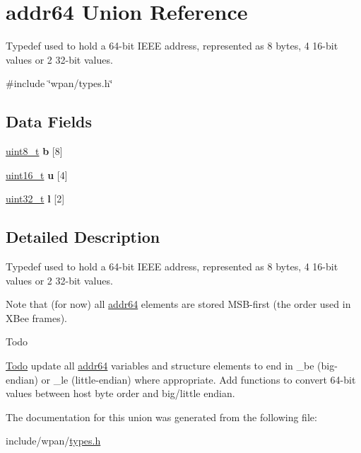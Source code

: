 \hypertarget{unionaddr64}{}\section{addr64 Union Reference}
\label{unionaddr64}


Typedef used to hold a 64-\/bit I\+E\+EE address, represented as 8 bytes, 4 16-\/bit values or 2 32-\/bit values.  




{\ttfamily \#include \char`\"{}wpan/types.\+h\char`\"{}}

\subsection*{Data Fields}
\begin{DoxyCompactItemize}
\item 
\hyperlink{group__hal__dos_gae1affc9ca37cfb624959c866a73f83c2}{uint8\+\_\+t} {\bfseries b} \mbox{[}8\mbox{]}
\item 
\hyperlink{group__hal__dos_ga5a8b2dc9e45a9ee81a94ef304fb62505}{uint16\+\_\+t} {\bfseries u} \mbox{[}4\mbox{]}
\item 
\hyperlink{group__hal__dos_ga09a1e304d66d35dd47daffee9731edaa}{uint32\+\_\+t} {\bfseries l} \mbox{[}2\mbox{]}
\end{DoxyCompactItemize}


\subsection{Detailed Description}
Typedef used to hold a 64-\/bit I\+E\+EE address, represented as 8 bytes, 4 16-\/bit values or 2 32-\/bit values. 

Note that (for now) all \hyperlink{unionaddr64}{addr64} elements are stored M\+S\+B-\/first (the order used in X\+Bee frames). \begin{DoxyRefDesc}{Todo}
\item[\hyperlink{todo__todo000026}{Todo}]update all \hyperlink{unionaddr64}{addr64} variables and structure elements to end in \+\_\+be (big-\/endian) or \+\_\+le (little-\/endian) where appropriate. Add functions to convert 64-\/bit values between host byte order and big/little endian. \end{DoxyRefDesc}


The documentation for this union was generated from the following file\+:\begin{DoxyCompactItemize}
\item 
include/wpan/\hyperlink{types_8h}{types.\+h}\end{DoxyCompactItemize}

